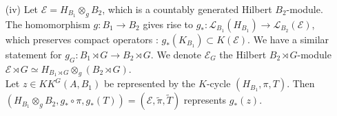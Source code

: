 \begin{dem}
\begin{enumerate}
\item[(iv)] Let $\mathcal E = H_{B_1}\otimes_g B_2$, which is a countably generated Hilbert $B_2$-module. The homomorphism $g:B_1\rightarrow B_2$ gives rise to $g_* : \mathcal L_{B_1}(H_{B_1})\rightarrow \mathcal L_{B_2}(\mathcal E)$, which preserves compact operators : $g_*(K_{B_1})\subset K(\mathcal E)$. We have a similar statement for $g_G : B_1\rtimes G\rightarrow B_2\rtimes G$. We denote $\mathcal E_G$ the Hilbert $B_2\rtimes G$-module $\mathcal E\rtimes G\simeq H_{B_1\rtimes G}\otimes_g (B_2\rtimes G)$.\\

Let $z\in KK^G(A,B_1)$ be represented by the $K$-cycle $(H_{B_1},\pi,T)$. Then $(H_{B_1}\otimes_g B_2,g_*\circ\pi, g_*(T))=(\mathcal E, \tilde\pi,\tilde T)$ represents $g_*(z)$.\\


\end{enumerate}
\end{dem}
